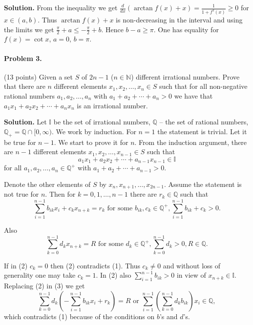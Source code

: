 \documentclass{article}
\begin{document}
\textbf{Solution.} From the inequality we get $\frac{d}{dx}(\arctan f(x) + x) = \frac{1}{1 + f^2(x)} \geq 0$ for $x \in (a, b)$. Thus $\arctan f(x) + x$ is non-decreasing in the interval and using the limits we get $\frac{\pi}{2} + a \leq -\frac{\pi}{2} + b$. Hence $b - a \geq \pi$. One has equality for $f(x) = \cot x$, $a = 0$, $b = \pi$.

\paragraph{Problem 3.} (13 points) Given a set $S$ of $2n - 1$ ($n \in \mathbb{N}$) different irrational numbers. Prove that there are $n$ different elements $x_1, x_2, \ldots, x_n \in S$ such that for all non-negative rational numbers $a_1, a_2, \ldots, a_n$ with $a_1 + a_2 + \cdots + a_n > 0$ we have that $a_1x_1 + a_2x_2 + \cdots + a_nx_n$ is an irrational number.

\textbf{Solution.} Let $\mathbb{I}$ be the set of irrational numbers,
$\mathbb{Q}$ – the set of rational numbers,
$\mathbb{Q}_+ = \mathbb{Q} \cap [0, \infty)$. We work by induction. For $n = 1$ the statement is trivial.
Let it be true for $n - 1$. We start to prove it for $n$.
From the induction argument, there are $n-1$
different elements $x_1, x_2, \ldots, x_{n-1} \in S$ such that
\begin{equation}
a_1x_1 + a_2x_2 + \cdots + a_{n-1}x_{n-1} \in \mathbb{I}
\end{equation}
for all $a_1, a_2, \ldots, a_n \in \mathbb{Q}^+$ with $a_1 + a_2 + \cdots + a_{n-1} > 0$.

Denote the other elements of $S$ by $x_n, x_{n+1}, \ldots, x_{2n-1}$. Assume the statement is not true for $n$. Then for $k = 0, 1, \ldots, n - 1$ there are $r_k \in \mathbb{Q}$ such that
\begin{equation}
\sum_{i=1}^{n-1} b_{ik}x_i + c_kx_{n+k} = r_k \text{ for some } b_{ik}, c_k \in \mathbb{Q}^+, \sum_{i=1}^{n-1} b_{ik} + c_k > 0.
\end{equation}

Also
\begin{equation}
\sum_{k=0}^{n-1} d_kx_{n+k} = R \text{ for some } d_k \in \mathbb{Q}^+, \sum_{k=0}^{n-1} d_k > 0, R \in \mathbb{Q}.
\end{equation}

If in (2) $c_k = 0$ then (2) contradicts (1). Thus $c_k \neq 0$ and without loss of generality one may take $c_k = 1$. In (2) also $\sum_{i=1}^{n-1} b_{ik} > 0$ in view of $x_{n+k} \in \mathbb{I}$. Replacing (2) in (3) we get
\begin{equation}
\sum_{k=0}^{n-1} d_k \left( -\sum_{i=1}^{n-1} b_{ik}x_i + r_k \right) = R \text{ or } \sum_{i=1}^{n-1} \left( \sum_{k=0}^{n-1} d_kb_{ik} \right) x_i \in \mathbb{Q},
\end{equation}
which contradicts (1) because of the conditions on $b$'s and $d$'s.
\end{document}
